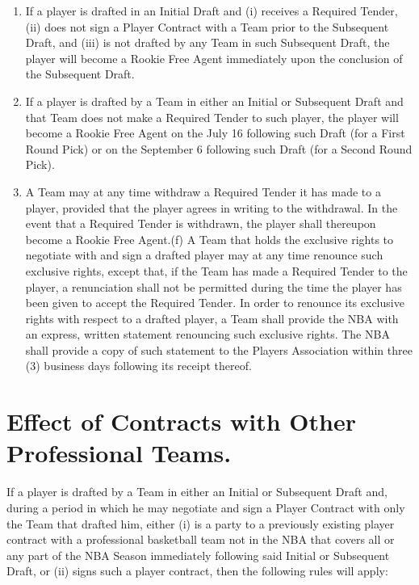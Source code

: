 \documentclass[
]{book}
\begin{document}
\begin{enumerate}
\item
  If a player is drafted in an Initial Draft and (i) receives a Required Tender, (ii) does not sign a Player Contract with a Team prior to the Subsequent Draft, and (iii) is not drafted by any Team in such Subsequent Draft, the player will become a Rookie Free Agent immediately upon the conclusion of the Subsequent Draft.
\item
  If a player is drafted by a Team in either an Initial or Subsequent Draft and that Team does not make a Required Tender to such player, the player will become a Rookie Free Agent on the July 16 following such Draft (for a First Round Pick) or on the September 6 following such Draft (for a Second Round Pick).
\item
  A Team may at any time withdraw a Required Tender it has made to a player, provided that the player agrees in writing to the withdrawal. In the event that a Required Tender is withdrawn, the player shall thereupon become a Rookie Free Agent.(f) A Team that holds the exclusive rights to negotiate with and sign a drafted player may at any time renounce such exclusive rights, except that, if the Team has made a Required Tender to the player, a renunciation shall not be permitted during the time the player has been given to accept the Required Tender. In order to renounce its exclusive rights with respect to a drafted player, a Team shall provide the NBA with an express, written statement renouncing such exclusive rights. The NBA shall provide a copy of such statement to the Players Association within three (3) business days following its receipt thereof.
\end{enumerate}

\hypertarget{effect-of-contracts-with-other-professional-teams.}{%
\section{Effect of Contracts with Other Professional Teams.}\label{effect-of-contracts-with-other-professional-teams.}}

If a player is drafted by a Team in either an Initial or Subsequent Draft and, during a period in which he may negotiate and sign a Player Contract with only the Team that drafted him, either (i) is a party to a previously existing player contract with a professional basketball team not in the NBA that covers all or any part of the NBA Season immediately following said Initial or Subsequent Draft, or (ii) signs such a player contract, then the following rules will apply:
\end{document}
